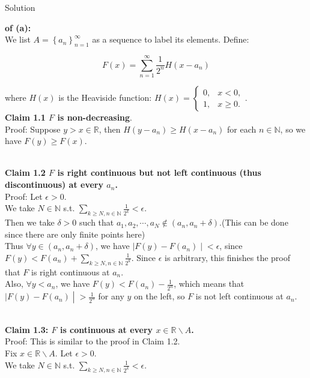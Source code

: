 \documentclass{qlnotes-export}
\begin{document}
\begin{qlsolution}{Solution}

\textbf{of (a):}\\
We list \(A = \left\{ a_{n} \right\}_{n = 1}^{\infty}\) as a sequence to label its elements. Define:

\[F(x) = \sum\limits_{n = 1}^{\infty}\frac{1}{2^{n}}H(x - a_{n})\]

where \(H(x)\) is the Heaviside function: \(H(x) = \left\{ \begin{matrix}
{0,} & {x < 0,} \\
{1,} & {x \geq 0.}
\end{matrix} \right.\).\\
\textbf{Claim 1.1 \(F\) is non-decreasing}.\\
Proof: Suppose \(y > x \in {\mathbb{R}}\), then \(H(y - a_{n}) \geq H(x - a_{n})\) for each \(n \in {\mathbb{N}}\), so we have \(F(y) \geq F(x)\).\\
\strut \\
\textbf{Claim 1.2 \(F\) is right continuous but not left continuous (thus discontinuous) at every \(a_{n}\).}\\
Proof: Let \(\epsilon > 0\).\\
We take \(N \in {\mathbb{N}}\) s.t. \(\sum_{k \geq N,n \in {\mathbb{N}}}\frac{1}{2^{k}} < \epsilon\).\\
Then we take \(\delta > 0\) such that \(a_{1},a_{2},\cdots,a_{N} \notin (a_{n},a_{n} + \delta)\).(This can be done since there are only finite points here)\\
Thus \(\forall y \in (a_{n},a_{n} + \delta)\), we have \(\left. |F(y) - F(a_{n}) \middle| < \epsilon \right.\), since \(F(y) < F(a_{n}) + \sum_{k \geq N,n \in {\mathbb{N}}}\frac{1}{2^{k}}\). Since \(\epsilon\) is arbitrary, this finishes the proof that \(F\) is right continuous at \(a_{n}\).\\
Also, \(\forall y < a_{n}\), we have \(F(y) < F(a_{n}) - \frac{1}{2^{n}}\), which means that \(\left. |F(y) - F(a_{n}) \middle| > \frac{1}{2^{n}} \right.\) for any \(y\) on the left, so \(F\) is not left continuous at \(a_{n}\).\\
\strut \\
\textbf{Claim 1.3: \(F\) is continuous at every \(x \in {\mathbb{R}}\backslash A\).}\\
Proof: This is similar to the proof in Claim 1.2.\\
Fix \(x \in {\mathbb{R}}\backslash A\). Let \(\epsilon > 0\).\\
We take \(N \in {\mathbb{N}}\) s.t. \(\sum_{k \geq N,n \in {\mathbb{N}}}\frac{1}{2^{k}} < \epsilon\).\\

\end{qlsolution}
\end{document}
